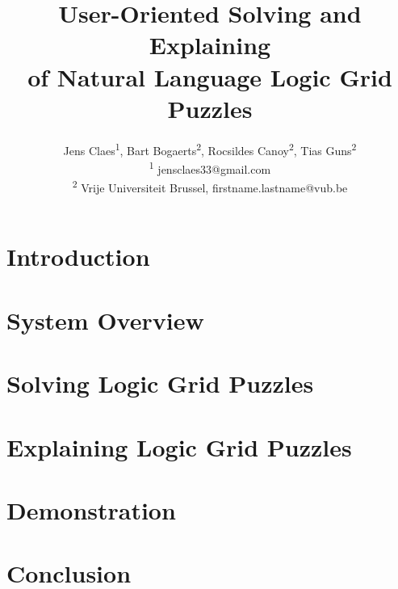 \documentclass[letterpaper]{article} %
\title{User-Oriented Solving and Explaining \\of Natural Language Logic Grid Puzzles}
\author{Jens Claes\textsuperscript{\rm 1}, Bart Bogaerts\textsuperscript{\rm 2}, Rocsildes Canoy\textsuperscript{\rm 2}, Tias Guns\textsuperscript{\rm 2} \\
\textsuperscript{\rm 1} jensclaes33@gmail.com\\
\textsuperscript{\rm 2} Vrije Universiteit Brussel, firstname.lastname@vub.be %
}
\begin{document}
 
 \newcommand\ourtool{\logicname{ZebraTutor}}

\maketitle

\begin{abstract}

\end{abstract}

\section{Introduction}




\section{System Overview}


%

\section{Solving Logic Grid Puzzles}\label{sec:solving}


\section{Explaining Logic Grid Puzzles}\label{sec:expl}


\section{Demonstration}\label{sec:demo}


\section{Conclusion}




\end{document}
